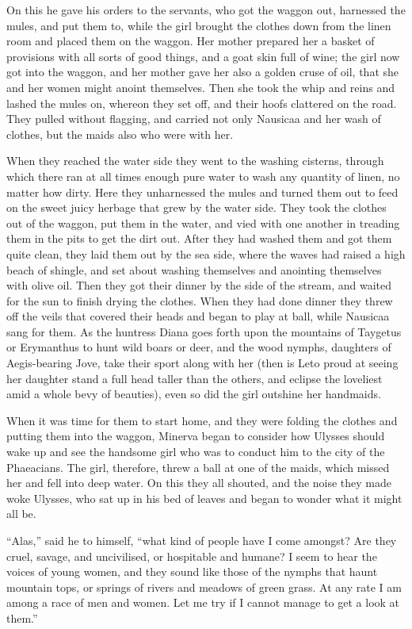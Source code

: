On this he gave his orders to the servants, who got the waggon out, harnessed
the mules, and put them to, while the girl brought the clothes down from the
linen room and placed them on the waggon. Her mother prepared her a basket of
provisions with all sorts of good things, and a goat skin full of wine; the
girl now got into the waggon, and her mother gave her also a golden cruse of
oil, that she and her women might anoint themselves. Then she took the whip and
reins and lashed the mules on, whereon they set off, and their hoofs clattered
on the road. They pulled without flagging, and carried not only Nausicaa and
her wash of clothes, but the maids also who were with her.

When they reached the water side they went to the washing cisterns, through
which there ran at all times enough pure water to wash any quantity of linen,
no matter how dirty. Here they unharnessed the mules and turned them out to
feed on the sweet juicy herbage that grew by the water side. They took the
clothes out of the waggon, put them in the water, and vied with one another in
treading them in the pits to get the dirt out. After they had washed them and
got them quite clean, they laid them out by the sea side, where the waves had
raised a high beach of shingle, and set about washing themselves and anointing
themselves with olive oil. Then they got their dinner by the side of the
stream, and waited for the sun to finish drying the clothes. When they had done
dinner they threw off the veils that covered their heads and began to play at
ball, while Nausicaa sang for them. As the huntress Diana goes forth upon the
mountains of Taygetus or Erymanthus to hunt wild boars or deer, and the wood
nymphs, daughters of Aegis-bearing Jove, take their sport along with her (then
is Leto proud at seeing her daughter stand a full head taller than the others,
and eclipse the loveliest amid a whole bevy of beauties), even so did the girl
outshine her handmaids.

When it was time for them to start home, and they were folding the clothes and
putting them into the waggon, Minerva began to consider how Ulysses should wake
up and see the handsome girl who was to conduct him to the city of the
Phaeacians. The girl, therefore, threw a ball at one of the maids, which missed
her and fell into deep water. On this they all shouted, and the noise they made
woke Ulysses, who sat up in his bed of leaves and began to wonder what it might
all be.

“Alas,” said he to himself, “what kind of people have I come amongst? Are they
cruel, savage, and uncivilised, or hospitable and humane? I seem to hear the
voices of young women, and they sound like those of the nymphs that haunt
mountain tops, or springs of rivers and meadows of green grass. At any rate I
am among a race of men and women. Let me try if I cannot manage to get a look
at them.”

